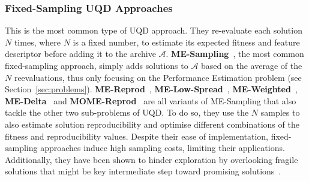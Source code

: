 \subsubsection{Fixed-Sampling UQD Approaches} \label{sec:fixed_sampling}
This is the most common type of UQD approach. They re-evaluate each solution $N$ times, where $N$ is a fixed number, to estimate its expected fitness and feature descriptor before adding it to the archive $\mathcal{A}$.
\textbf{ME-Sampling}~\cite{hbr}, the most common fixed-sampling approach, simply adds solutions to $\mathcal{A}$ based on the average of the $N$ reevaluations, thus only focusing on the Performance Estimation problem (see Section~\ref{sec:problems}).
\textbf{ME-Reprod}~\cite{grillotti2023don}, \textbf{ME-Low-Spread}~\cite{mace2023quality}, \textbf{ME-Weighted}~\cite{flageat2024exploring}, \textbf{ME-Delta}~\cite{flageat2024exploring} and \textbf{MOME-Reprod}~\cite{flageat2024exploring} are all variants of ME-Sampling that also tackle the other two sub-problems of UQD. To do so, they use the $N$ samples to also estimate solution reproducibility and optimise different combinations of the fitness and reproducibility values. 
Despite their ease of implementation, fixed-sampling approaches induce high sampling costs, limiting their applications. Additionally, they have been shown to hinder exploration by overlooking fragile solutions that might be key intermediate step toward promising solutions~\cite{flageat2023uncertain, flageat2024exploring, ea_uncertain_2}.


